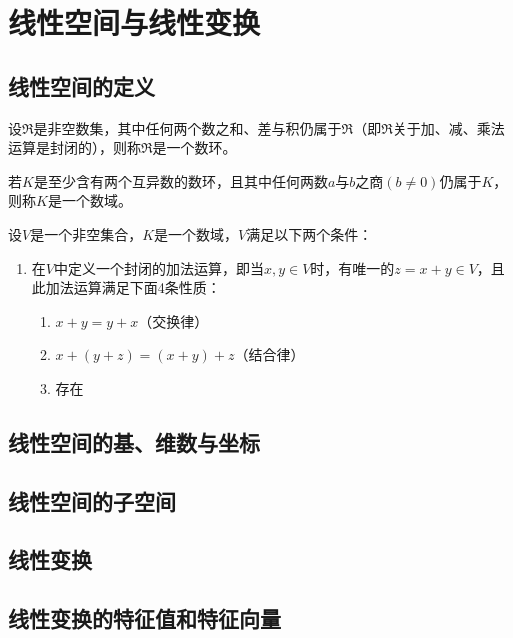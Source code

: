 \section{线性空间与线性变换}
\subsection{线性空间的定义}
    \begin{definition}[数环]
        设$\mathfrak{R}$是非空数集，其中任何两个数之和、差与积仍属于$\mathfrak{R}$（即$\mathfrak{R}$关于加、减、乘法运算是封闭的），则称$\mathfrak{R}$是一个{\heiti 数环}。
    \end{definition}

    \begin{definition}[数域]
        若$K$是至少含有两个互异数的数环，且其中任何两数$a$与$b$之商$(b\neq 0)$仍属于$K$，则称$K$是一个{\heiti 数域}。
    \end{definition}

    \begin{definition}[线性空间]
        设$V$是一个非空集合，$K$是一个数域，$V$满足以下两个条件：
        \begin{enumerate}[(1)]
            \item 在$V$中定义一个封闭的加法运算，即当$x,y\in V$时，有唯一的$z=x+y\in V$，且此加法运算满足下面4条性质：
            \begin{enumerate}[1)]
                \item $x+y=y+x$（交换律）
                \item $x+(y+z)=(x+y)+z$（结合律）
                \item 存在
            \end{enumerate}
        \end{enumerate}
    \end{definition}


\subsection{线性空间的基、维数与坐标}



\subsection{线性空间的子空间}




\subsection{线性变换}



\subsection{线性变换的特征值和特征向量}